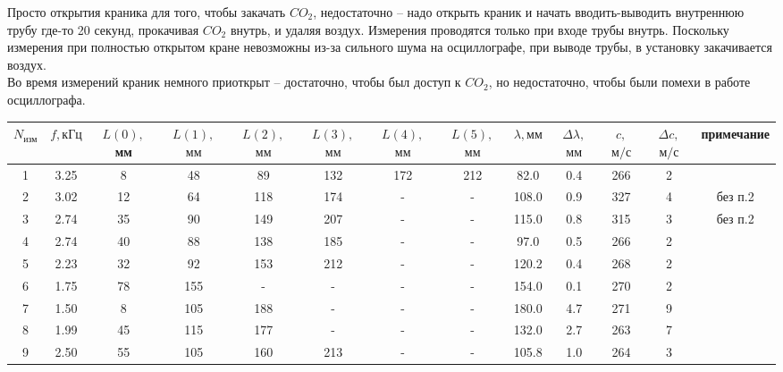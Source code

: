 \documentclass[12pt,a4paper]{article}
\begin{document}
Просто открытия краника для того, чтобы закачать $CO_2$, недостаточно -- надо открыть краник и начать вводить-выводить внутреннюю трубу где-то 20 секунд, прокачивая $CO_2$ внутрь, и удаляя воздух.
 Измерения проводятся только при входе трубы внутрь. Поскольку измерения при полностью открытом кране невозможны из-за сильного шума на осциллографе, при выводе трубы, в установку закачивается воздух.\\
Во время измерений краник немного приоткрыт -- достаточно, чтобы был доступ к $CO_2$, но недостаточно, чтобы были помехи в работе осциллографа.

\begin{center}
\begin{tabular}{|c|c|c|c|c|c|c|c|c|c|c|c|c|}
\hline $N_\text{изм}$&$f, \text{кГц}$&$L(0),$ мм&$L(1),$ $\text{мм}$&$L(2),$ $\text{мм}$&$L(3),$ $\text{мм}$&$L(4),$ $\text{мм}$&$L(5),$ $\text{мм}$&$\lambda, \text{мм}$&$\Delta \lambda,$ $\text{мм}$&$c,$ $\text{м}/\text{с}$&$\Delta c,$ $\text{м}/\text{с}$&примечание\\\hline
1&3.25&8&48&89&132&172&212&82.0&0.4&266&2&\\ \hline
2&3.02&12&64&118&174&-&-&108.0&0.9&327&4&без п.2\\ \hline
3&2.74&35&90&149&207&-&-&115.0&0.8&315&3&без п.2\\ \hline
4&2.74&40&88&138&185&-&-&97.0&0.5&266&2&\\ \hline
5&2.23&32&92&153&212&-&-&120.2&0.4&268&2&\\ \hline
6&1.75&78&155&-&-&-&-&154.0&0.1&270&2&\\ \hline
7&1.50&8&105&188&-&-&-&180.0&4.7&271&9&\\ \hline
8&1.99&45&115&177&-&-&-&132.0&2.7&263&7&\\ \hline
9&2.50&55&105&160&213&-&-&105.8&1.0&264&3&\\ \hline
\end{tabular}
\end{center}
\end{document}
